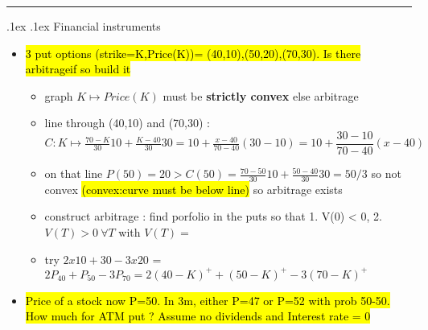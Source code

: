 \documentclass[10pt,landscape,a4paper]{article}
\makeatletter
\renewcommand{\section}{\@startsection{section}{1}{0mm}%
                                {.1ex}%
                                {.1ex}%
                                {\color{blue}\sffamily\small\bfseries}}
\makeatother
\begin{document}
\begin{multicols*}{4}
\begin{spacing}{0.1}
\begin{itemize}
\begin{itemize}
\end{itemize}


\end{itemize}

\hrule
\section {Financial instruments}

\begin{itemize}

\item \hl{ 3 put options (strike=K,Price(K))=  (40,10),(50,20),(70,30). Is there arbitrageif so build it }

\begin{itemize}

\item graph $K \mapsto Price(K)$ must be \textbf{strictly convex} else arbitrage
\item line through (40,10) and (70,30) : $ C: K \mapsto \frac{70-K}{30} 10 + \frac{K-40}{30} 30 =  10 + \frac{x-40}{70-40}(30-10) = 10 + \dfrac{30-10}{70-40}(x-40)$
\item  on that line $P(50)=20 > C(50)= \frac{70-50}{30} 10 + \frac{50-40}{30} 30 =50/3$ so not convex \hl{(convex:curve must be below line)} so arbitrage exists
\item construct arbitrage : find porfolio in the puts so that 1. V(0) < 0, 2. $V(T) > 0\ \forall T$ with $V(T) = $
\item try $ 2x10 + 30 - 3 x 20$ = $2 P_{40}+P_{50} - 3 P_{70}=2 (40-K)^+ + (50-K)^+ - 3 (70-K)^+$
 
\end{itemize}

\item \hl{ Price of a stock now P=50. In 3m, either P=47 or P=52 with prob 50-50. How much for ATM put ? Assume no dividends and Interest rate = 0 }


\end{itemize}
\end{spacing}
\end{multicols*}
\end{document}
